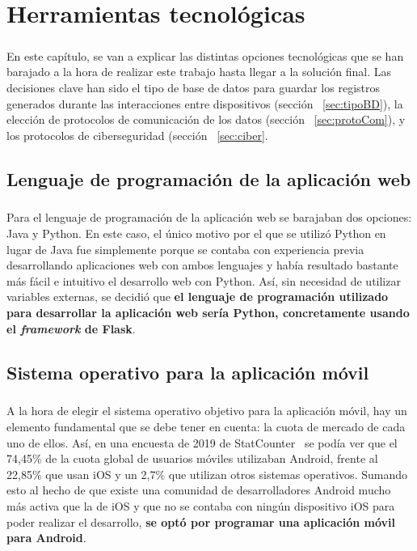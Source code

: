 %
%

\chapter{Herramientas tecnológicas}

\paragraph{}
En este capítulo, se van a explicar las distintas opciones tecnológicas que se han barajado a la hora de realizar este trabajo hasta llegar a la solución final. Las decisiones clave han sido el tipo de base de datos para guardar los registros generados durante las interacciones entre dispositivos (sección ~\ref{sec:tipoBD}), la elección de protocolos de comunicación de los datos (sección ~\ref{sec:protoCom}),  y los protocolos de ciberseguridad (sección ~\ref{sec:ciber}.


\section{Lenguaje de programación de la aplicación web}
\paragraph{}
Para el lenguaje de programación de la aplicación web se barajaban dos opciones: Java y Python. En este caso, el único motivo por el que se utilizó Python en lugar de Java fue simplemente porque se contaba con experiencia previa desarrollando aplicaciones web con ambos lenguajes y había resultado bastante más fácil e intuitivo el desarrollo web con Python. Así, sin necesidad de utilizar variables externas, se decidió que \textbf{el lenguaje de programación utilizado para desarrollar la aplicación web sería Python, concretamente usando el \textit{framework} de Flask}.

\section{Sistema operativo para la aplicación móvil}
\paragraph{}
A la hora de elegir el sistema operativo objetivo para la aplicación móvil, hay un elemento fundamental que se debe tener en cuenta: la cuota de mercado de cada uno de ellos. Así, en una encuesta de 2019 de StatCounter~\citep{statCounter} se podía ver que el 74,45\% de la cuota global de usuarios móviles utilizaban Android, frente al 22,85\% que usan iOS y un 2,7\% que utilizan otros sistemas operativos. Sumando esto al hecho de que existe una comunidad de desarrolladores Android mucho más activa que la de iOS y que no se contaba con ningún dispositivo iOS para poder realizar el desarrollo, \textbf{se optó por programar una aplicación móvil para Android}.

